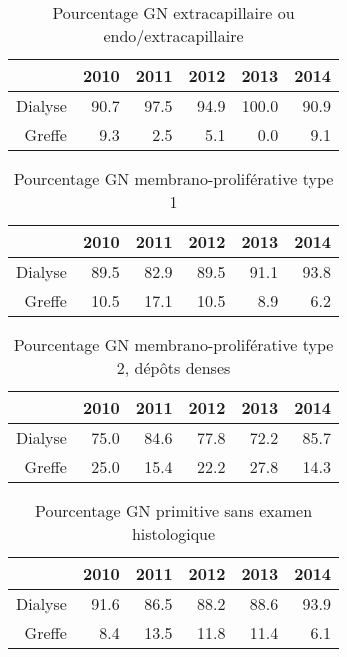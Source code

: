 \documentclass[11pt,a4paper]{article}\usepackage[]{graphicx}\usepackage[]{color}
\begin{document}
\begin{table}[H]
\centering
\begin{tabular}{rrrrrr}
  \hline
 & 2010 & 2011 & 2012 & 2013 & 2014 \\ 
  \hline
Dialyse & 90.7 & 97.5 & 94.9 & 100.0 & 90.9 \\ 
  Greffe & 9.3 & 2.5 & 5.1 & 0.0 & 9.1 \\ 
   \hline
\end{tabular}
\caption{Pourcentage GN extracapillaire ou endo/extracapillaire} 
\end{table}
\begin{table}[H]
\centering
\begin{tabular}{rrrrrr}
  \hline
 & 2010 & 2011 & 2012 & 2013 & 2014 \\ 
  \hline
Dialyse & 89.5 & 82.9 & 89.5 & 91.1 & 93.8 \\ 
  Greffe & 10.5 & 17.1 & 10.5 & 8.9 & 6.2 \\ 
   \hline
\end{tabular}
\caption{Pourcentage GN membrano-proliférative type 1} 
\end{table}
\begin{table}[H]
\centering
\begin{tabular}{rrrrrr}
  \hline
 & 2010 & 2011 & 2012 & 2013 & 2014 \\ 
  \hline
Dialyse & 75.0 & 84.6 & 77.8 & 72.2 & 85.7 \\ 
  Greffe & 25.0 & 15.4 & 22.2 & 27.8 & 14.3 \\ 
   \hline
\end{tabular}
\caption{Pourcentage GN membrano-proliférative type 2, dépôts denses} 
\end{table}
\begin{table}[H]
\centering
\begin{tabular}{rrrrrr}
  \hline
 & 2010 & 2011 & 2012 & 2013 & 2014 \\ 
  \hline
Dialyse & 91.6 & 86.5 & 88.2 & 88.6 & 93.9 \\ 
  Greffe & 8.4 & 13.5 & 11.8 & 11.4 & 6.1 \\ 
   \hline
\end{tabular}
\caption{Pourcentage GN primitive sans examen histologique} 
\end{table}
\end{document}

